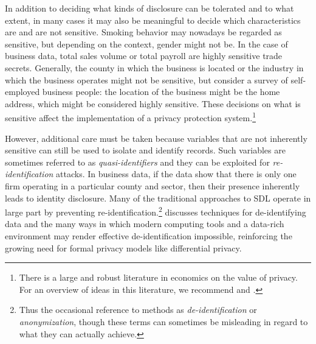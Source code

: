 In addition to deciding what kinds of disclosure can be tolerated and to what extent, in many cases it may also be meaningful to decide which characteristics are and are not sensitive. Smoking behavior may nowadays be regarded as sensitive, but depending on the context, gender might not be. In the case of business data, total sales volume or total payroll are highly sensitive trade secrets. Generally, the county in which the business is located or the industry in which the business operates might not be sensitive, but consider a survey of self-employed business people: the location of the business might be the home address, which might be considered highly sensitive. These decisions on what is sensitive affect the implementation of a privacy protection system.\footnote{There is a large and robust literature in economics on the value of privacy. For an overview of ideas in this literature, we recommend \citet{varian_economic_2002} and \citet{acquisti_economics_2016}.}

However, additional care must be taken because variables that are not inherently sensitive can still be used to isolate and identify records. Such variables are sometimes referred to as \emph{quasi-identifiers} and they can be exploited for \emph{re-identification} attacks. In business data, if the data show that there is only one firm operating in a particular county and sector, then their presence inherently leads to identity disclosure. Many of the traditional approaches to SDL operate in large part by preventing re-identification.\footnote{Thus the occasional reference to methods as \emph{de-identification} or \emph{anonymization}, though these terms can sometimes be misleading in regard to what they can actually achieve.} \citet{garfinkel_-identification_2015} discusses techniques for de-identifying data and the many ways in which modern computing tools and a data-rich environment may render effective de-identification impossible, reinforcing the growing need for formal privacy models like differential privacy.

